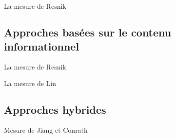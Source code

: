   La mesure de Resnik

  \subsection{Approches basées sur le contenu informationnel}
  \label{sec:semantic-sim:ci}

  La mesure de Resnik

  La mesure de Lin

  \subsection{Approches hybrides}
  \label{sec:semantic-sim:hybrides}

  Mesure de Jiang et Conrath

